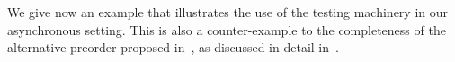 


We give now an example that illustrates the use of the testing
machinery in our asynchronous setting. This is also a counter-example
to the completeness of the alternative preorder
proposed in~\cite{DBLP:conf/fsttcs/CastellaniH98}, as discussed
in detail in~.






